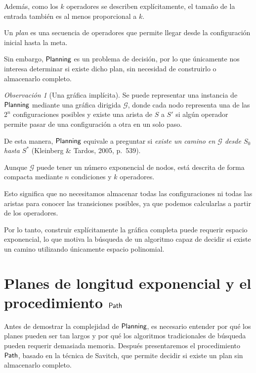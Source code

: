 \documentclass[11pt,letterpaper]{article}
\theoremstyle{plain}
\theoremstyle{definition}
\theoremstyle{remark}
\newtheorem{observacion}[teorema]{Observación}
\newcommand{\nombreMat}[1]{\ensuremath{\text{\fontencoding{OT1}\fontfamily{cmss}\upshape\selectfont #1}}}
\newcommand{\PLANNING}{\nombreMat{Planning}}
\newcommand{\Path}{\nombreMat{Path}}
\begin{document}
Además, como los $k$ operadores se describen explícitamente,
el tamaño de la entrada también es al menos proporcional
a $k$.


Un \emph{plan} es una secuencia de operadores que
permite llegar desde la configuración inicial hasta la meta.



Sin embargo, \PLANNING{} es un problema de decisión,
por lo que únicamente nos interesa determinar si existe
dicho plan, sin necesidad de construirlo o almacenarlo
completo.


\begin{observacion}[Una gráfica implícita]

Se puede representar una instancia de \PLANNING{}
mediante una gráfica dirigida $\mathcal{G}$, donde cada nodo
representa una de las $2^{n}$ configuraciones posibles
y existe una arista de $S$ a $S'$ si algún operador
permite pasar de una configuración a otra en un solo paso.

De esta manera, \PLANNING{} equivale a preguntar si
\emph{existe un camino en $\mathcal{G}$ desde $S_0$
hasta $S^{*}$}
(Kleinberg \& Tardos, 2005, p.~539).

Aunque $\mathcal{G}$ puede tener un número exponencial
de nodos, está descrita de forma compacta mediante
$n$ condiciones y $k$ operadores.


Esto significa que no necesitamos almacenar todas
las configuraciones ni todas las aristas para conocer
las transiciones posibles, ya que podemos calcularlas
a partir de los operadores.



Por lo tanto, construir explícitamente la gráfica completa
puede requerir espacio exponencial, lo que motiva la
búsqueda de un algoritmo capaz de decidir si existe
un camino utilizando únicamente espacio polinomial.


\end{observacion}



\newpage
\section{Planes de longitud exponencial y el procedimiento \Path}


Antes de demostrar la complejidad de \PLANNING{}, es necesario
entender por qué los planes pueden ser tan largos y por qué
los algoritmos tradicionales de búsqueda pueden requerir
demasiada memoria. Después presentaremos el procedimiento
\Path, basado en la técnica de Savitch, que permite decidir
si existe un plan sin almacenarlo completo.
\end{document}
